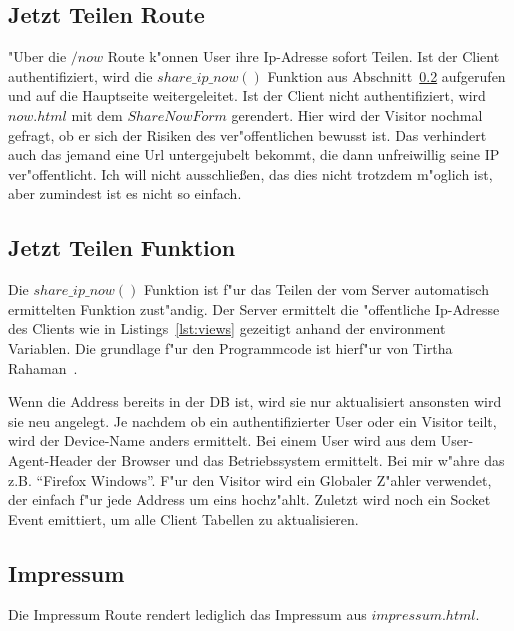 \subsection{Jetzt Teilen Route}\label{subsec:jetzt-teilen-roote}
{"U}ber die $/now$ Route k{"o}nnen User ihre Ip-Adresse sofort Teilen.
Ist der Client authentifiziert, wird die $share\_ip\_now()$ Funktion aus Abschnitt~\ref{subsec:jetzt-teilen-funktion} aufgerufen und auf die Hauptseite weitergeleitet.
Ist der Client nicht authentifiziert, wird $now.html$ mit dem $ShareNowForm$ gerendert.
Hier wird der Visitor nochmal gefragt, ob er sich der Risiken des ver{"o}ffentlichen bewusst ist.
Das verhindert auch das jemand eine Url untergejubelt bekommt, die dann unfreiwillig seine IP ver{"o}ffentlicht.
Ich will nicht ausschlie\ss en, das dies nicht trotzdem m{"o}glich ist, aber zumindest ist es nicht so einfach.

\subsection{Jetzt Teilen Funktion}\label{subsec:jetzt-teilen-funktion}
Die $share\_ip\_now()$ Funktion ist f{"u}r das Teilen der vom Server automatisch ermittelten Funktion zust{"a}ndig.
Der Server ermittelt die {"o}ffentliche Ip-Adresse des Clients wie in Listings~\ref{lst:views} gezeitigt anhand der environment Variablen.
Die grundlage f{"u}r den Programmcode ist hierf{"u}r von Tirtha Rahaman~\cite{getip}.

Wenn die Address bereits in der DB ist, wird sie nur aktualisiert ansonsten wird sie neu angelegt.
Je nachdem ob ein authentifizierter User oder ein Visitor teilt, wird der Device-Name anders ermittelt.
Bei einem User wird aus dem User-Agent-Header der Browser und das Betriebssystem ermittelt.
Bei mir w{"a}hre das z.B. ``Firefox Windows''.
F{"u}r den Visitor wird ein Globaler Z{"a}hler verwendet, der einfach f{"u}r jede Address um eins hochz{"a}hlt.
Zuletzt wird noch ein Socket Event emittiert, um alle Client Tabellen zu aktualisieren.

\subsection{Impressum}\label{subsec:impressum}
Die Impressum Route rendert lediglich das Impressum aus $impressum.html$.


